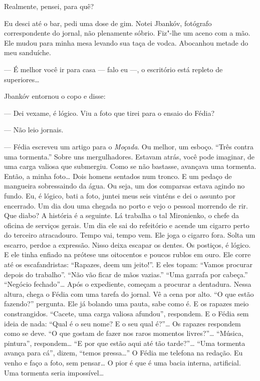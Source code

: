 Realmente, pensei, para quê?

\bigskip

Eu desci até o bar, pedi uma dose de gim. Notei Jbankóv, fotógrafo
correspondente do jornal, não plenamente sóbrio. Fiz"-lhe um aceno com a
mão. Ele mudou para minha mesa levando sua taça de vodca. Abocanhou
metade do meu sanduíche.

--- É melhor você ir para casa --- falo eu ---, o escritório está
repleto de superiores\ldots{}

Jbankóv entornou o copo e disse:

--- Dei vexame, é lógico. Viu a foto que tirei para o ensaio do Fédia?

--- Não leio jornais.

--- Fédia escreveu um artigo para o \emph{Moçada}. Ou melhor, um esboço.
``Três contra uma tormenta.'' Sobre uns
mergulhadores. Estavam atrás, você pode imaginar, de uma carga valiosa
que submergiu. Como se não bastasse, avançava uma tormenta. Então, a
minha foto\ldots{} Dois homens sentados num tronco. E um pedaço de mangueira
sobressaindo da água. Ou seja, um dos comparsas estava agindo no fundo.
Eu, é lógico, bati a foto, juntei meus seis vinténs e dei o assunto por
encerrado. Um dia dou uma chegada no porto e vejo o pessoal morrendo de
rir. Que diabo? A história é a seguinte. Lá trabalha o tal Mironienko, o
chefe da oficina de serviços gerais. Um dia ele sai do refeitório e
acende um cigarro perto do terceiro atracadouro. Tempo vai, tempo vem.
Ele joga o cigarro fora. Solta um escarro, perdoe a expressão. Nisso
deixa escapar os dentes. Os postiços, é lógico. E ele tinha enfiado na
prótese uns oitocentos e poucos rublos em ouro. Ele corre até os
escafandristas: ``Rapazes, deem um jeito!''. E eles topam: ``Vamos
procurar depois do trabalho''. ``Não vão ficar de mãos vazias.'' ``Uma
garrafa por cabeça.'' ``Negócio fechado''\ldots{} Após o expediente, começam
a procurar a dentadura. Nessa altura, chega o Fédia com uma tarefa do
jornal. Vê a cena por alto. ``O que estão fazendo?'' pergunta. Ele já
bolando uma pauta, sabe como é. E os rapazes meio constrangidos.
``Cacete, uma carga valiosa afundou'', respondem. E o Fédia sem ideia de
nada: ``Qual é o seu nome? E o seu qual é?''\ldots{} Os rapazes respondem
como se deve. ``O que gostam de fazer nos raros momentos livres?''\ldots{}
``Música, pintura'', respondem\ldots{} ``E por que estão aqui até tão
tarde?''\ldots{} ``Uma tormenta avança para cá'', dizem, ``temos pressa\ldots{}''
O Fédia me telefona na redação. Eu venho e faço a foto, sem pensar\ldots{} O
pior é que é uma bacia interna, artificial. Uma tormenta seria
impossível\ldots{}

